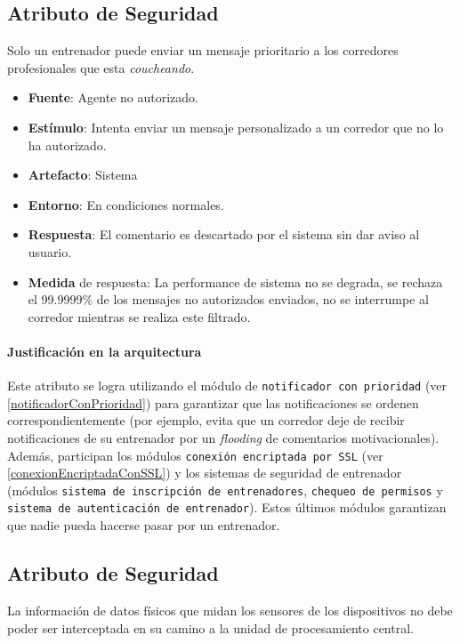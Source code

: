 \subsection{Atributo de Seguridad}
Solo un entrenador puede enviar un mensaje prioritario a los corredores profesionales que esta \emph{coucheando}.

\begin{itemize}
  \item \textbf{Fuente}: Agente no autorizado.
  \item \textbf{Estímulo}: Intenta enviar un mensaje personalizado a un corredor que no lo ha autorizado.
  \item \textbf{Artefacto}: Sistema
  \item \textbf{Entorno}: En condiciones normales.
  \item \textbf{Respuesta}: El comentario es descartado por el sistema sin dar aviso al usuario.
  \item \textbf{Medida} de respuesta: La performance de sistema no se degrada, se rechaza el 99.9999\% de los mensajes no autorizados enviados, no se interrumpe al corredor mientras se realiza este filtrado.
\end{itemize}

\paragraph{Justificación en la arquitectura}
Este atributo se logra utilizando el módulo de \texttt{notificador con prioridad} (ver \ref{notificadorConPrioridad}) para garantizar que las notificaciones se ordenen correspondientemente (por ejemplo, evita que un corredor deje de recibir notificaciones de su entrenador por un \emph{flooding} de comentarios motivacionales). Además, participan los módulos \texttt{conexión encriptada por SSL} (ver \ref{conexionEncriptadaConSSL}) y los sistemas de seguridad de entrenador (módulos \texttt{sistema de inscripción de entrenadores}, \texttt{chequeo de permisos} y \texttt{sistema de autenticación de entrenador}). Estos últimos módulos garantizan que nadie pueda hacerse pasar por un entrenador.


\subsection{Atributo de Seguridad}
La información de datos físicos que midan los sensores de los dispositivos no debe poder ser interceptada en su camino a la unidad de procesamiento central.

